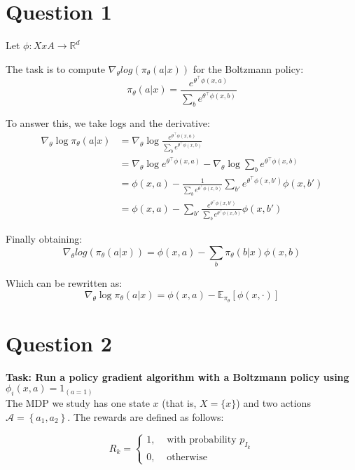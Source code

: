 \documentclass[a4paper, 11pt]{article} %
\begin{document}
\section*{Question 1}

Let $\phi : X x A \rightarrow \mathbb{R}^{d}$

The task is to compute $\nabla_{\theta}log(\pi_{\theta}(a|x))$ for the Boltzmann policy:
\begin{equation}
\pi_{\theta}(a | x)= \frac{e^{\theta^{\top} \phi(x, a)}}{\sum_{b} e^{\theta^{\top} \phi(x, b)}}
\end{equation}

To answer this, we take logs and the derivative:
\begin{align}
\nabla_{\theta} \log \pi_{\theta}(a | x) 
&=\nabla_{\theta} \log \frac{e^{\theta^{\top} \phi(x, a)}}{\sum_{b} e^{\theta^{\top} \phi(x, b)}}  \\
&=\nabla_{\theta} \log e^{\theta^{\top} \phi(x, a)}-\nabla_{\theta} \log \sum_{b} e^{\theta^{\top} \phi(x, b)} \\
&=\phi(x, a)-\frac{1}{\sum_{b} e^{\theta^{\top} \phi(x, b)}}\sum_{b'} e^{\theta^{\top} \phi(x, b')} \phi(x, b') \\
& =\phi(x, a)-\sum_{b'} \frac{e^{\theta^{\top} \phi(x, b')} }{\sum_{b} e^{\theta^{\top} \phi (x, b)} } \phi(x, b')
\end{align}

Finally obtaining:
\begin{equation}
\nabla_{\theta}log(\pi_{\theta}(a|x)) = \phi(x, a)-\sum_{b} \pi_{\theta}(b|x) \phi(x, b)
\end{equation}

Which can be rewritten as:
\begin{equation}
\nabla_{\theta} \log \pi_{\theta}(a| x)=\phi(x, a)-\mathbb{E}_{\pi_{\theta}}[\phi(x, \cdot)]
\end{equation}


\section*{Question 2}
\textbf{Task: Run a policy gradient algorithm with a Boltzmann policy using $\phi_i(x,a) = 1_{(a=1)}$} \\

The MDP we study has one state $x$ (that is, $X=\{x\}$) and two actions $\mathcal{A}=\left\{a_{1}, a_{2}\right\}$. The rewards are defined as follows: 

$$
R_{k}=\left\{\begin{array}{ll}{1,} & {\text { with probability } p_{I_{k}}} \\ {0,} & {\text { otherwise }}\end{array}\right.
$$
\end{document}
